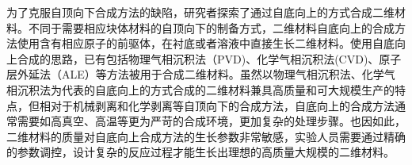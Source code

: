     为了克服自顶向下合成方法的缺陷，研究者探索了通过自底向上的方式合成二维材料。不同于需要相应块体材料的自顶向下的制备方式，二维材料自底向上的合成方法使用含有相应原子的前驱体，在衬底或者溶液中直接生长二维材料。使用自底向上合成的思路，已有包括物理气相沉积法（PVD)、化学气相沉积法(CVD)、原子层外延法（ALE）等方法被用于合成二维材料。虽然以物理气相沉积法、化学气相沉积法为代表的自底向上的方式合成的二维材料兼具高质量和可大规模生产的特点，但相对于机械剥离和化学剥离等自顶向下的合成方法，自底向上的合成方法通常需要如高真空、高温等更为严苛的合成环境，更加复杂的处理步骤。也因如此，二维材料的质量对自底向上合成方法的生长参数非常敏感，实验人员需要通过精确的参数调控，设计复杂的反应过程才能生长出理想的高质量大规模的二维材料。

    \begin{figure}
\end{figure}
